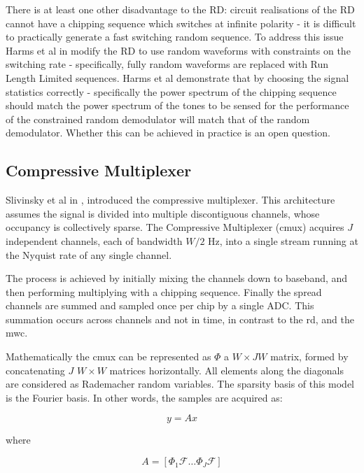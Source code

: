 There is at least one other disadvantage to the RD: circuit realisations of the RD cannot have a chipping sequence which switches at infinite polarity - it is difficult to practically generate a fast switching random sequence. To address this issue Harms et al in  \cite{harms2013constrained} modify the RD to use random waveforms with constraints on the switching rate - specifically, fully random waveforms are replaced with Run Length Limited sequences. Harms et al demonstrate that by choosing the signal statistics correctly - specifically the power spectrum of the chipping sequence should match the power spectrum of the tones to be sensed for the performance of the constrained random demodulator will match that of the random demodulator. Whether this can be achieved in practice is an open question. 

\subsection{Compressive Multiplexer}
Slivinsky et al in \cite{Slavinsky2011}, introduced the compressive multiplexer. This architecture assumes the signal is divided into multiple discontiguous channels, whose occupancy is collectively sparse. The Compressive Multiplexer (\gls{cmux}) acquires \(J\) independent channels, each of bandwidth \(W/2\) Hz, into a single stream running at the Nyquist rate of any single channel. 

The process is achieved by initially mixing the channels down to baseband, and then performing multiplying with a chipping sequence. Finally the spread channels are summed and sampled once per chip by a single ADC. This summation occurs across channels and not in time, in contrast to the \gls{rd}, and the \gls{mwc}.

Mathematically the \gls{cmux} can be represented as \(\Phi\) a \(W \times JW\) matrix, formed by concatenating \(J\) \(W \times W\) matrices horizontally. All elements along the diagonals are considered as Rademacher random variables. The sparsity basis of this model is the Fourier basis. In other words, the samples are acquired as:

\begin{equation}
y = Ax
\end{equation}

where 

\begin{equation}
A = \left[\Phi_1 \mathcal{F} \ldots \Phi_J \mathcal{F}\right]
\end{equation}

